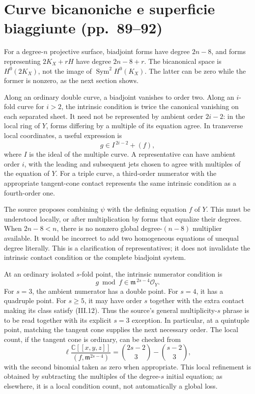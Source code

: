 \section[Curve e superficie biaggiunte]{Curve bicanoniche e superficie biaggiunte (pp.~89--92)}\label{commentary-III-11}

For a degree-\(n\) projective surface, biadjoint forms have degree \(2n-8\), and forms representing \(2K_X+rH\) have degree \(2n-8+r\). The bicanonical space is \(H^0(2K_X)\), not the image of \(\operatorname{Sym}^2H^0(K_X)\). The latter can be zero while the former is nonzero, as the next section shows.

Along an ordinary double curve, a biadjoint vanishes to order two. Along an \(i\)-fold curve for \(i>2\), the intrinsic condition is twice the canonical vanishing on each separated sheet. It need not be represented by ambient order \(2i-2\): in the local ring of \(Y\), forms differing by a multiple of its equation agree. In transverse local coordinates, a useful expression is \[
g\in I^{\,2i-2}+(f),
\] where \(I\) is the ideal of the multiple curve. A representative can have ambient order \(i\), with the leading and subsequent jets chosen to agree with multiples of the equation of \(Y\). For a triple curve, a third-order numerator with the appropriate tangent-cone contact represents the same intrinsic condition as a fourth-order one.

The source proposes combining \(\psi\) with the defining equation \(f\) of \(Y\). This must be understood locally, or after multiplication by forms that equalize their degrees. When \(2n-8<n\), there is no nonzero global degree-\((n-8)\) multiplier available. It would be incorrect to add two homogeneous equations of unequal degree literally. This is a clarification of representatives; it does not invalidate the intrinsic contact condition or the complete biadjoint system.

At an ordinary isolated \(s\)-fold point, the intrinsic numerator condition is \[
g\bmod f\in\mathfrak m^{\,2s-4}\mathcal O_Y.
\tag{III.12}
\] For \(s=3\), the ambient numerator has a double point. For \(s=4\), it has a quadruple point. For \(s\geq5\), it may have order \(s\) together with the extra contact making its class satisfy (III.12). Thus the source's general multiplicity-\(s\) phrase is to be read together with its explicit \(s=3\) exception. In particular, at a quintuple point, matching the tangent cone supplies the next necessary order. The local count, if the tangent cone is ordinary, can be checked from \[
\ell\frac{\mathbb{C}[[x,y,z]]}{(f,\mathfrak m^{2s-4})}
=\binom{2s-2}{3}-\binom{s-2}{3},
\] with the second binomial taken as zero when appropriate. This local refinement is obtained by subtracting the multiples of the degree-\(s\) initial equation; as elsewhere, it is a local condition count, not automatically a global loss.

